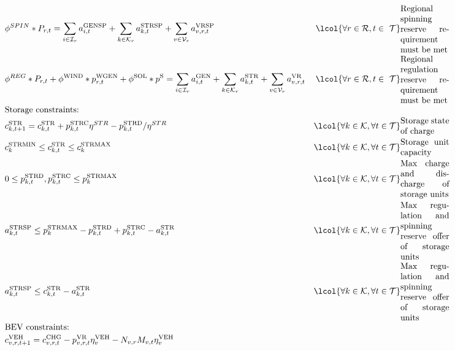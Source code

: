 \documentclass[9pt,twoside,lineno]{pnas-new}
\begin{document}
\begin{table}
\begin{align}
&\phi^{SPIN}*P_{r,t}= \sum_{i\in \mathcal{I}_r}a^{\mathrm{GENSP}}_{i,t}+ \sum_{k\in \mathcal{K}_r}a^{\mathrm{STRSP}}_{k,t} +\sum_{v\in \mathcal{V}_r}a^{\mathrm{VRSP}}_{v,r,t}
 &   \lcol{\forall r\in \mathcal{R}, t\in\ \mathcal{T}}
 & \parbox{2cm}{\textrm{Regional spinning reserve requirement must be met}}
 \label{eq:Rspinconstraint21} \\
 & \phi^{REG}*P_{r,t}+\phi^{\mathrm{WIND}}*p^{\mathrm{WGEN}}_{r,t}
 +\phi^{\mathrm{SOL}}*p^{\mathrm{S}}
 = \sum_{i\in \mathcal{I}_r}a^{\mathrm{GEN}}_{i,t}+ \sum_{k\in \mathcal{K}_r}a^{\mathrm{STR}}_{k,t} +\sum_{v\in \mathcal{V}_r}a^{\mathrm{VR}}_{v,r,t}
 &   \lcol{\forall r\in \mathcal{R}, t\in\ \mathcal{T}}
 & \parbox{2cm}{\textrm{Regional regulation reserve requirement must be met}}
 \label{eq:Rspinconstraint21} \\ 
\multicolumn{4}{l}{Storage constraints:} \nonumber \\
 & c^{\mathrm{STR}}_{k,t+1}=c^{\mathrm{STR}}_{k,t}+
 p^{\mathrm{STRC}}_{k,t} \eta^{STR}-p^{\mathrm{STRD}}_{k,t}/\eta^{STR}
 &    \lcol{\forall k\in \mathcal{K}, \forall t\in \mathcal{T}}  
 & \parbox{2cm}{\textrm{Storage state of charge}}
  \label{eq1str} \\
 & c^{\mathrm{STRMIN}}_{k} \le c^{\mathrm{STR}}_{k,t}\le c^{\mathrm{STRMAX}}_{k}  & \lcol{\forall k\in \mathcal{K}, \forall t\in \mathcal{T}}
 & \parbox{2cm}{\textrm{Storage unit capacity}}
 \label{eq2str} \\
  & 0\leq p^{\mathrm{STRD}}_{k,t},p^{\mathrm{STRC}}_{k,t}\leq p^{\mathrm{STRMAX}}_{k}  & \lcol{\forall k\in \mathcal{K}, \forall t\in \mathcal{T}}
 & \parbox{2cm}{\textrm{Max charge and discharge of storage units}}
 \label{eq3str} \\
   & a^{\mathrm{STRSP}}_{k,t}\leq p^{\mathrm{STRMAX}}_{k}
   - p^{\mathrm{STRD}}_{k,t}+p^{\mathrm{STRC}}_{k,t}-a^{\mathrm{STR}}_{k,t}
   & \lcol{\forall k\in \mathcal{K}, \forall t\in \mathcal{T}}
 & \parbox{2cm}{\textrm{Max regulation and spinning reserve offer of storage units}}
 \label{eq4str} \\
    & a^{\mathrm{STRSP}}_{k,t}\leq c^{\mathrm{STR}}_{k,t}-a^{\mathrm{STR}}_{k,t}
   & \lcol{\forall k\in \mathcal{K}, \forall t\in \mathcal{T}}
 & \parbox{2cm}{\textrm{Max regulation and spinning reserve offer of storage units}}
 \label{eq5str} \\
\multicolumn{4}{l}{BEV constraints:} \nonumber \\
 & c^{\mathrm{VEH}}_{v,r,t+1}=c^{\mathrm{CHG}}_{v,r,t} -  p^{\mathrm{VR}}_{v,r,t}\eta^{\mathrm{VEH}}_v - N_{v,r}M_{v,t}\eta^{\mathrm{VEH}}_{v}

\end{align}
\end{table}
\end{document}
